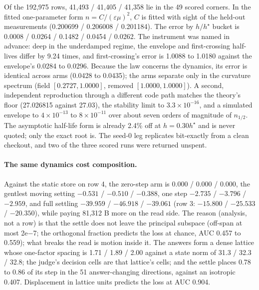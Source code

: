 \documentclass{article} %
\newcommand{\sci}[2]{\ensuremath{#1\times10^{#2}}}
\begin{document}
\noindent Of the 192,975 rows, 41,493 / 41,405 / 41,358 lie in the 49 scored corners. In the fitted
one-parameter form $n=C/(\varepsilon\mu)^2$, $C$ is fitted with sight of the held-out measurements
(0.200699 / 0.206008 / 0.201184). %
The error by $h/h^\star$ bucket is 0.0008 / 0.0264 / 0.1482 / 0.0454 / 0.0262. The instrument was
named in advance: deep in the underdamped regime, the envelope and first-crossing half-lives differ
by 9.24 times, and first-crossing's error is 1.0088 to 1.0180 against the envelope's 0.0284 to 0.0296.
Because the law concerns the dynamics, its error is identical across arms (0.0428 to 0.0435); the
arms separate only in the curvature spectrum (field $[0.2727, 1.0000]$, removed $[1.0000, 1.0000]$).
A second, independent reproduction through a different code path matches the theory's floor
(27.026815 against 27.03), the stability limit to \sci{3.3}{-16}, and a simulated envelope to
\sci{4}{-13} to \sci{8}{-11} over about seven orders of magnitude of $n_{1/2}$. The asymptotic
half-life form is already 2.4\% off at $h=0.30h^\star$ and is never quoted; only the exact root is.
The seed-0 leg replicates bit-exactly from a clean checkout, and two of the three scored runs were
returned unspent. %

\paragraph{The same dynamics cost composition.} Against the static store on row 4, the zero-step
arm is $0.000$ / $0.000$ / $0.000$, the gentlest moving setting $-0.531$ / $-0.510$ / $-0.388$, one
step $-2.735$ / $-3.796$ / $-2.959$, and full settling $-39.959$ / $-46.918$ / $-39.061$ (row 3:
$-15.800$ / $-25.533$ / $-20.350$), while paying 81,312 B more on the read side.
The reason (analysis, not a row) is that the settle does not leave the principal subspace (off-span
at most 2e$-$7; the orthogonal fraction predicts the loss at chance, AUC 0.457 to 0.559); what breaks
the read is motion inside it. The answers form a dense lattice whose one-factor spacing is 1.71 / 1.89 /
2.00 against a state norm of 31.3 / 32.3 / 32.8; the judge's decision cells are that lattice's
cells; and the settle places 0.78 to 0.86 of its step in the 51 answer-changing directions, against
an isotropic 0.407. Displacement in lattice units predicts the loss at AUC 0.904.
\end{document}
